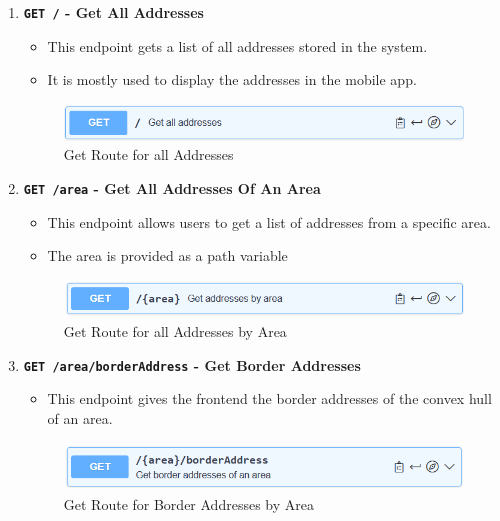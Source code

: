     \begin{enumerate}
        \item \textbf{\texttt{GET /} - Get All Addresses}
        \begin{itemize}
            \item This endpoint gets a list of all addresses stored in the system. 
            \item It is mostly used to display the addresses in the mobile app.
        \end{itemize} 
        \begin{figure} [H]
            \centering
            \includegraphics [width=1\textwidth] {images/andreas/praxis/getAllAddresses.png}
            \caption{Get Route for all Addresses}
        \end{figure}

        \item \textbf{\texttt{GET /{area}} - Get All Addresses Of An Area}
        \begin{itemize}
            \item This endpoint allows users to get a list of addresses from a specific area.
            \item The area is provided as a path variable
        \end{itemize}
        \begin{figure} [H]
            \centering
            \includegraphics [width=1\textwidth] {images/andreas/praxis/getAddressesByArea.png}
            \caption{Get Route for all Addresses by Area}
        \end{figure}

        \item \textbf{\texttt{GET /{area}/borderAddress} - Get Border Addresses}
        \begin{itemize}
            \item This endpoint gives the frontend the border addresses of the convex hull of an area.
        \end{itemize} 
        \begin{figure} [H]
            \centering
            \includegraphics [width=1\textwidth] {images/andreas/praxis/getBorderAddressesOfArea.png}
            \caption{Get Route for Border Addresses by Area}
        \end{figure}
    \end{enumerate}    

